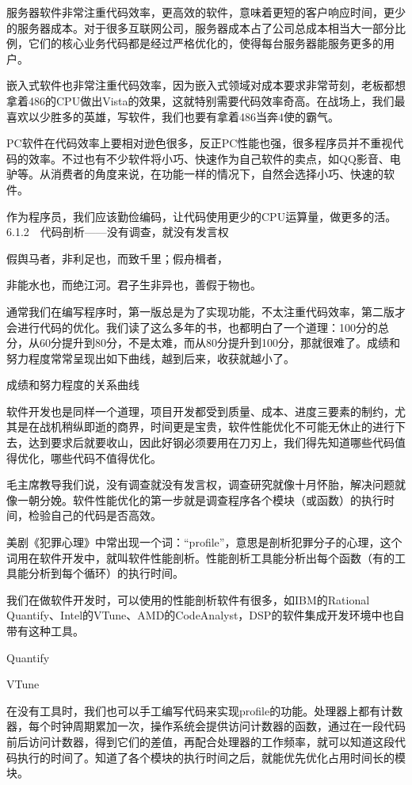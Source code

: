 \documentclass[12pt,UTF8]{ctexbook}
\begin{document}
服务器软件非常注重代码效率，更高效的软件，意味着更短的客户响应时间，更少的服务器成本。对于很多互联网公司，服务器成本占了公司总成本相当大一部分比例，它们的核心业务代码都是经过严格优化的，使得每台服务器能服务更多的用户。

嵌入式软件也非常注重代码效率，因为嵌入式领域对成本要求非常苛刻，老板都想拿着486的CPU做出Vista的效果，这就特别需要代码效率奇高。在战场上，我们最喜欢以少胜多的英雄，写软件，我们也要有拿着486当奔4使的霸气。

PC软件在代码效率上要相对逊色很多，反正PC性能也强，很多程序员并不重视代码的效率。不过也有不少软件将小巧、快速作为自己软件的卖点，如QQ影音、电驴等。从消费者的角度来说，在功能一样的情况下，自然会选择小巧、快速的软件。

作为程序员，我们应该勤俭编码，让代码使用更少的CPU运算量，做更多的活。
6.1.2　代码剖析——没有调查，就没有发言权

假舆马者，非利足也，而致千里；假舟楫者，

非能水也，而绝江河。君子生非异也，善假于物也。

通常我们在编写程序时，第一版总是为了实现功能，不太注重代码效率，第二版才会进行代码的优化。我们读了这么多年的书，也都明白了一个道理：100分的总分，从60分提升到80分，不是太难，而从80分提升到100分，那就很难了。成绩和努力程度常常呈现出如下曲线，越到后来，收获就越小了。

成绩和努力程度的关系曲线

软件开发也是同样一个道理，项目开发都受到质量、成本、进度三要素的制约，尤其是在战机稍纵即逝的商界，时间更是宝贵，软件性能优化不可能无休止的进行下去，达到要求后就要收山，因此好钢必须要用在刀刃上，我们得先知道哪些代码值得优化，哪些代码不值得优化。

毛主席教导我们说，没有调查就没有发言权，调查研究就像十月怀胎，解决问题就像一朝分娩。软件性能优化的第一步就是调查程序各个模块（或函数）的执行时间，检验自己的代码是否高效。

美剧《犯罪心理》中常出现一个词：“profile”，意思是剖析犯罪分子的心理，这个词用在软件开发中，就叫软件性能剖析。性能剖析工具能分析出每个函数（有的工具能分析到每个循环）的执行时间。

我们在做软件开发时，可以使用的性能剖析软件有很多，如IBM的Rational Quantify、Intel的VTune、AMD的CodeAnalyst，DSP的软件集成开发环境中也自带有这种工具。

Quantify

VTune

在没有工具时，我们也可以手工编写代码来实现profile的功能。处理器上都有计数器，每个时钟周期累加一次，操作系统会提供访问计数器的函数，通过在一段代码前后访问计数器，得到它们的差值，再配合处理器的工作频率，就可以知道这段代码执行的时间了。知道了各个模块的执行时间之后，就能优先优化占用时间长的模块。
\end{document}
